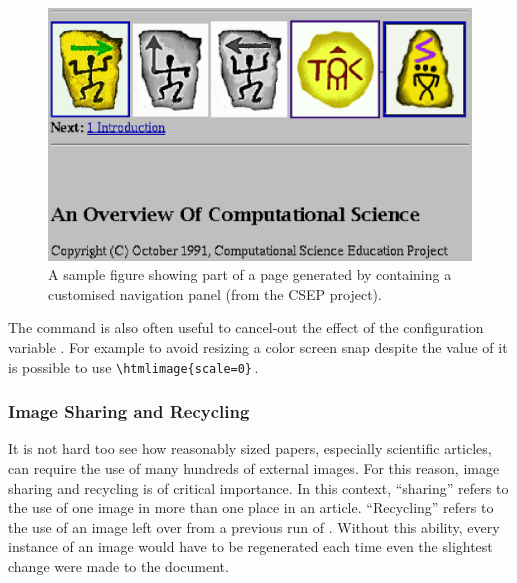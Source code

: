 %
%
%
% 
\begin{figure}[hbt]
    \centering \includegraphics[width=5in]{psfiles/figure.ps}
    \latex{\addtocounter{footnote}{-1}}%
    \caption{A sample figure showing part of a page generated by
       \protect\latextohtml{} containing a customised navigation panel 
       (from the 
        CSEP project).}\label{fig:example}
\end{figure}


%

\noindent
The  command is also often useful to cancel-out the
effect of the configuration variable .
For example to avoid resizing a color screen snap despite 
the value of  it is possible to 
use \verb|\htmlimage{scale=0}|\,.


\subsubsection{Image Sharing and Recycling\label{recycling}}%
%
It is not hard too see how reasonably sized papers,
especially scientific articles, can require
the use of many hundreds of external images.  For this reason,
image sharing and recycling is of critical importance.
In this context, ``sharing'' refers to the use of one
image in more than one place in an article.  ``Recycling''
refers to the use of an image left over from a previous
run of \latextohtml.  Without this ability, every instance of an
image would have to be regenerated each time even the
slightest change were made to the document.

